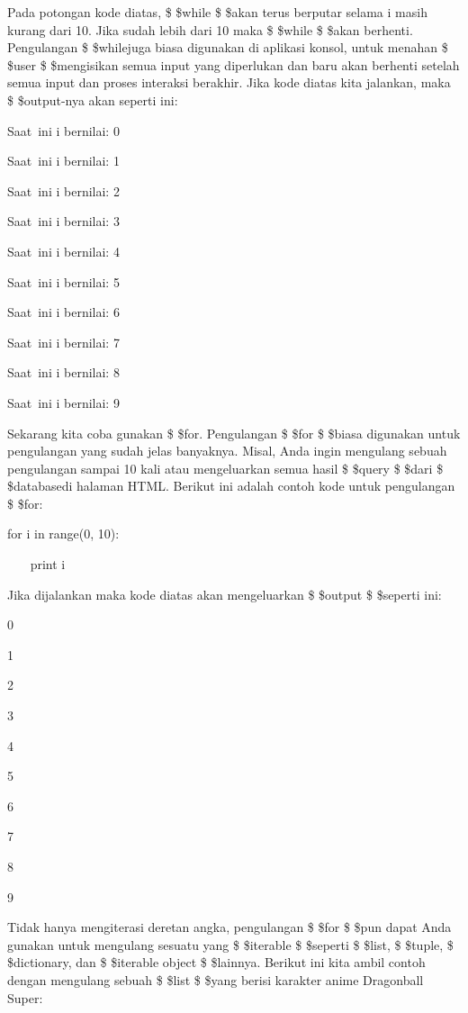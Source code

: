 Pada potongan kode diatas, \$  \$while \$  \$akan terus berputar selama i masih kurang dari 10. Jika sudah lebih dari 10 maka \$  \$while \$  \$akan berhenti. Pengulangan \$  \$whilejuga biasa digunakan di aplikasi konsol, untuk menahan \$  \$user \$  \$mengisikan semua input yang diperlukan dan baru akan berhenti setelah semua input dan proses interaksi berakhir. Jika kode diatas kita jalankan, maka \$  \$output-nya akan seperti ini: \par
\vspace{12pt}
Saat~ini i bernilai:  0 \par
Saat~ini i bernilai:  1 \par
Saat~ini i bernilai:  2 \par
Saat~ini i bernilai:  3 \par
Saat~ini i bernilai:  4 \par
Saat~ini i bernilai:  5 \par
Saat~ini i bernilai:  6 \par
Saat~ini i bernilai:  7 \par
Saat~ini i bernilai:  8 \par
Saat~ini i bernilai:  9 \par
\vspace{12pt}
Sekarang kita coba gunakan \$  \$for. Pengulangan \$  \$for \$  \$biasa digunakan untuk pengulangan yang sudah jelas banyaknya. Misal, Anda ingin mengulang sebuah pengulangan sampai 10 kali atau mengeluarkan semua hasil \$  \$query \$  \$dari \$  \$databasedi halaman HTML. Berikut ini adalah contoh kode untuk pengulangan \$  \$for: \par
for i in range(0, 10): \par
~~~ print i \par
Jika dijalankan maka kode diatas akan mengeluarkan \$  \$output \$  \$seperti ini: \par
\vspace{12pt}
0 \par
1 \par
2 \par
3 \par
4 \par
5 \par
6 \par
7 \par
8 \par
9 \par
Tidak hanya mengiterasi deretan angka, pengulangan \$  \$for \$  \$pun dapat Anda gunakan untuk mengulang sesuatu yang \$  \$iterable \$  \$seperti \$  \$list, \$  \$tuple, \$  \$dictionary, dan \$  \$iterable object \$  \$lainnya. Berikut ini kita ambil contoh dengan mengulang sebuah \$  \$list \$  \$yang berisi karakter anime Dragonball Super: \par
